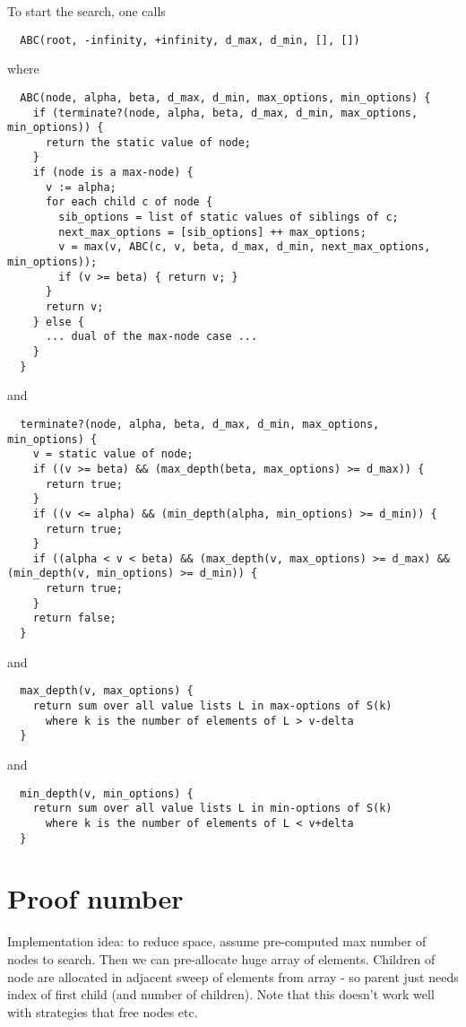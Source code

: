 \documentclass[10pt,dvipdfmx,letterpaper]{report}
\begin{document}
To start the search, one calls
{\scriptsize
\begin{verbatim}
  ABC(root, -infinity, +infinity, d_max, d_min, [], [])
\end{verbatim}
}
where
{\scriptsize
\begin{verbatim}
  ABC(node, alpha, beta, d_max, d_min, max_options, min_options) {
    if (terminate?(node, alpha, beta, d_max, d_min, max_options, min_options)) {
      return the static value of node;
    }
    if (node is a max-node) {
      v := alpha;
      for each child c of node {
        sib_options = list of static values of siblings of c;
        next_max_options = [sib_options] ++ max_options;
        v = max(v, ABC(c, v, beta, d_max, d_min, next_max_options, min_options));
        if (v >= beta) { return v; }
      }
      return v;
    } else {
      ... dual of the max-node case ...
    }
  }
\end{verbatim}
}
and
{\scriptsize
\begin{verbatim}
  terminate?(node, alpha, beta, d_max, d_min, max_options, min_options) {
    v = static value of node;
    if ((v >= beta) && (max_depth(beta, max_options) >= d_max)) {
      return true;
    }
    if ((v <= alpha) && (min_depth(alpha, min_options) >= d_min)) {
      return true;
    }
    if ((alpha < v < beta) && (max_depth(v, max_options) >= d_max) && (min_depth(v, min_options) >= d_min)) {
      return true;
    }
    return false;
  }
\end{verbatim}
}
and
{\scriptsize
\begin{verbatim}
  max_depth(v, max_options) {
    return sum over all value lists L in max-options of S(k)
      where k is the number of elements of L > v-delta
  }
\end{verbatim}
}
and
{\scriptsize
\begin{verbatim}
  min_depth(v, min_options) {
    return sum over all value lists L in min-options of S(k)
      where k is the number of elements of L < v+delta
  }
\end{verbatim}
}

\section{Proof number}

Implementation idea: to reduce space, assume pre-computed max number of nodes to search.  Then we can 
pre-allocate huge array of elements.  Children of node are allocated in adjacent sweep of elements from
array - so parent just needs index of first child (and number of children).  Note that this doesn't work
well with strategies that free nodes etc.
\end{document}
